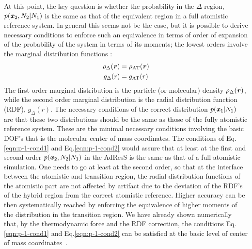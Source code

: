 \documentclass[aip,jcp,a4paper,reprint,onecolumn]{revtex4-1}
\newcommand{\bluec}[1]{{\color{blue} #1}}
\newcommand{\vect}[1]{\textbf{\textit{#1}}}
\newcommand{\AT}{{\textrm{{AT}}}}
\newcommand{\HY}{{\Delta}}
\begin{document}
\noindent
At this point, the key question is whether the probability in the $\HY$ region, $p(\vect
x_2, N_2 | N_1)$ is the same as that of the equivalent region in a full atomistic reference
system. In general this seems not be the case, but it is possible to
derive necessary conditions to enforce such an equivalence in terms of order of expansion of the probability of the system in terms of its moments; the lowest orders involve
the marginal distribution functions \cite{rdfcorr}:
\begin{align}\label{eqn:p-1-cond1}
  \rho_{\HY}(\vect r) &= \rho_{\AT}(\vect r)\\\label{eqn:p-1-cond2}
  g_{\HY}( r) &= g_{\AT}(r)
\end{align}
The first order marginal distribution is the particle (or molecular) density 
$\rho_{\HY}(\vect r)$, while the second order marginal distribution is
the radial distribution function (RDF), $g_{\HY}(r)$. 
The necessary
conditions of the correct distribution $p(\vect x_1|N_1)$
are that these two distributions should be the same as those of the fully atomistic reference system. 
These are the minimal necessary conditions involving the basic DOF's that is the molecular center of mass coordinates. 
The conditions of Eq.\ref{eqn:p-1-cond1} and Eq.\ref{eqn:p-1-cond2} would assure that at least at the first and second order $p(\vect x_2, N_2 | N_1)$ in the AdResS is the same as that of a full atomistic simulation. One needs to go at least at the second order, so that at the interface between the atomistic and transition region, the radial distribution functions of the atomistic part are not affected by artifact due to the deviation of the RDF's of the hybrid region from the correct atomistic reference. Higher accuracy can be then systematically reached by enforcing the equivalence of higher moments of the distribution in the transition region.
\bluec{We have already shown numerically that, by the thermodynamic force and the RDF correction, the conditions Eq.\ref{eqn:p-1-cond1} and Eq.\ref{eqn:p-1-cond2} can be satisfied at the basic level of center of mass coordinates~\cite{rdfcorr}.}
\end{document}
